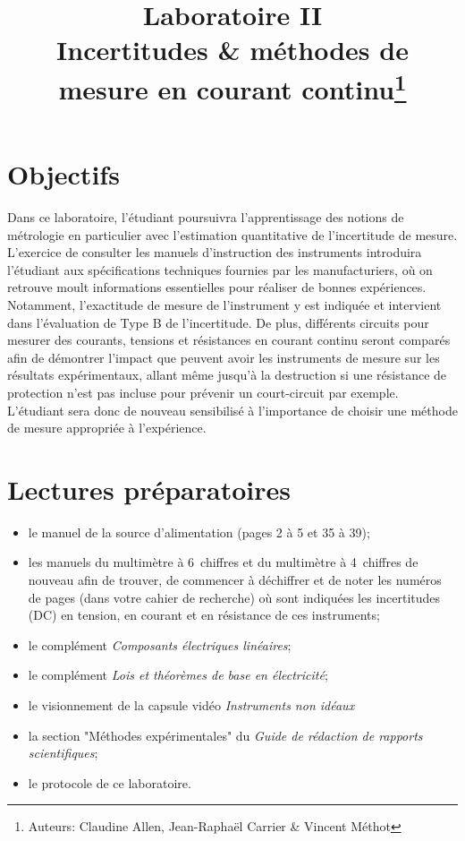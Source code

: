 \documentclass[canadien,12pt,oneside,letterpaper]{article}
\title{\textbf{Laboratoire II}\\Incertitudes \& méthodes de mesure en courant continu\thanks{Auteurs: Claudine Allen, Jean-Raphaël Carrier \& Vincent Méthot}}
\date{}
\begin{document}
\maketitle \vspace{-2cm}

\section{Objectifs}

Dans ce laboratoire, l’étudiant poursuivra l’apprentissage des notions de métrologie en particulier avec l’estimation quantitative de l’incertitude de mesure. L’exercice de consulter les manuels d’instruction des instruments introduira l’étudiant aux spécifications techniques fournies par les manufacturiers, où on retrouve moult informations essentielles pour réaliser de bonnes expériences. Notamment, l’exactitude de mesure de l’instrument y est indiquée et intervient dans l’évaluation de Type B de l’incertitude. De plus, différents circuits pour mesurer des courants, tensions et résistances en courant continu seront comparés afin de démontrer l’impact que peuvent avoir les instruments de mesure sur les résultats expérimentaux, allant même jusqu’à la destruction si une résistance de protection n’est pas incluse pour prévenir un court-circuit par exemple. L’étudiant sera donc de nouveau sensibilisé à l’importance de choisir une méthode de mesure appropriée à l’expérience.


\section[Lectures préparatoires]{Lectures préparatoires} \label{sec:prep}
\begin{itemize} \itemsep4pt
\item le manuel de la source d'alimentation (pages 2 à 5 et 35 à 39);
\item les manuels du multimètre à 6\textonehalf~chiffres et du multimètre à 4\textonehalf~chiffres de nouveau afin de trouver,  de commencer à déchiffrer et de noter les numéros de pages (dans votre cahier de recherche) où sont indiquées les incertitudes (DC) en tension, en courant et en résistance de ces instruments;
\item le complément \textit{Composants électriques linéaires};
\item le complément \textit{Lois et théorèmes de base en électricité};
\item le visionnement de la capsule vidéo \textit{Instruments non idéaux}
\item la section "Méthodes expérimentales" du \textit{Guide de rédaction de rapports scientifiques};
\item le protocole de ce laboratoire.
\end{itemize}
\vspace{1ex}
\noindent{}
\end{document}
